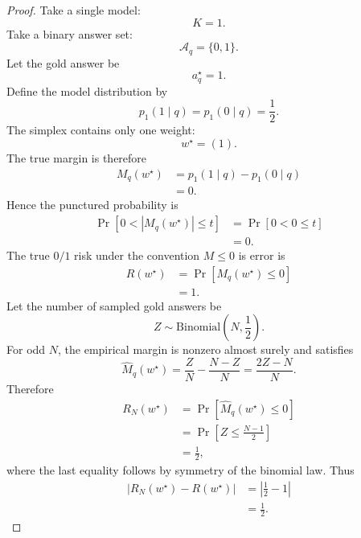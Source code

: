 \documentclass{article} %
\providecommand{\Aq}{\mathcal{A}_q}
\providecommand{\Risk}{R}
\providecommand{\Mhat}{\widehat{M}}
\providecommand{\wstar}{w^{\star}}
\begin{document}
\begin{proof}
Take a single model:
\begin{equation}
\label{eq:app4-counter-K}
K=1.
\end{equation}
Take a binary answer set:
\begin{equation}
\label{eq:app4-counter-A}
\Aq=\{0,1\}.
\end{equation}
Let the gold answer be
\begin{equation}
\label{eq:app4-counter-gold}
a_q^\star=1.
\end{equation}
Define the model distribution by
\begin{equation}
\label{eq:app4-counter-p}
p_1(1\mid q)=p_1(0\mid q)=\frac{1}{2}.
\end{equation}
The simplex contains only one weight:
\begin{equation}
\label{eq:app4-counter-w}
\wstar=(1).
\end{equation}
The true margin is therefore
\begin{align}
M_q(\wstar)
&=
p_1(1\mid q)-p_1(0\mid q)
\label{eq:app4-counter-margin-a}
\\
&=
0.
\label{eq:app4-counter-margin-b}
\end{align}
Hence the punctured probability is
\begin{align}
\Pr\!\left[
0<|M_q(\wstar)|\le t
\right]
&=
\Pr\!\left[
0<0\le t
\right]
\label{eq:app4-counter-punct-proof-a}
\\
&=
0.
\label{eq:app4-counter-punct-proof-b}
\end{align}
The true \(0/1\) risk under the convention \(M\le 0\) is error is
\begin{align}
\Risk(\wstar)
&=
\Pr\!\left[
M_q(\wstar)\le 0
\right]
\label{eq:app4-counter-R-a}
\\
&=
1.
\label{eq:app4-counter-R-b}
\end{align}
Let the number of sampled gold answers be
\begin{equation}
\label{eq:app4-counter-Z}
Z\sim\mathrm{Binomial}\!\left(N,\frac{1}{2}\right).
\end{equation}
For odd \(N\), the empirical margin is nonzero almost surely and satisfies
\begin{equation}
\label{eq:app4-counter-Mhat}
\Mhat_q(\wstar)
=
\frac{Z}{N}-\frac{N-Z}{N}
=
\frac{2Z-N}{N}.
\end{equation}
Therefore
\begin{align}
R_N(\wstar)
&=
\Pr\!\left[
\Mhat_q(\wstar)\le 0
\right]
\label{eq:app4-counter-RN-a}
\\
&=
\Pr\!\left[
Z\le \frac{N-1}{2}
\right]
\label{eq:app4-counter-RN-b}
\\
&=
\frac{1}{2},
\label{eq:app4-counter-RN-c}
\end{align}
where the last equality follows by symmetry of the binomial law.  Thus
\begin{align}
\left|
R_N(\wstar)-\Risk(\wstar)
\right|
&=
\left|
\frac{1}{2}-1
\right|
\label{eq:app4-counter-final-a}
\\
&=
\frac{1}{2}.
\label{eq:app4-counter-final-b}
\end{align}
\end{proof}
\end{document}
